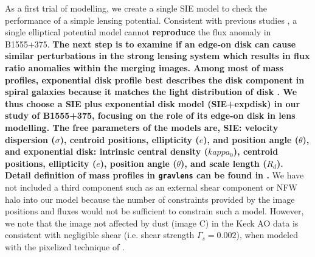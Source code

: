 \documentclass[useAMS,usenatbib]{mnras}
\begin{document}
As a first trial of modelling, we create a single SIE model to check
the performance of a simple lensing potential. Consistent with
previous studies \citep{Marlow99, Xu14}, a single elliptical
potential model cannot \textbf{reproduce} the flux anomaly in B1555+375.
\textbf{The next step is to examine if an edge-on disk can cause similar perturbations in the strong lensing system  which results in flux ratio anomalies within the merging images. Among most of mass profiles, exponential disk profile best describes the disk component in spiral galaxies because it matches the light distribution of disk \citep{Kee98}. We thus choose a SIE plus exponential disk model (SIE+expdisk) in our study of B1555+375, focusing on the role of its edge-on disk in lens modelling. The free parameters of the models are, SIE: velocity dispersion ($\sigma$), centroid positions, ellipticity ($e$), and position angle ($\theta$), and exponential disk: intrinsic central density ($kappa_0$), centroid positions, ellipticity ($e$), position angle ($\theta$), and scale length ($R_d$). Detail definition of mass profiles in {\tt gravlens} can be found in \citet{Kee01}.}
  We have not included a third component such as an external
shear component or NFW halo into our model because the number of constraints provided by the
image positions and fluxes would not be sufficient to constrain such a
model. However, we note that the image not affected by dust (image C)
in the Keck AO data is consistent with negligible shear (i.e. shear
strength $\Gamma_s=0.002$), when modeled with the pixelized technique
of \citet{V09}.
\end{document}
